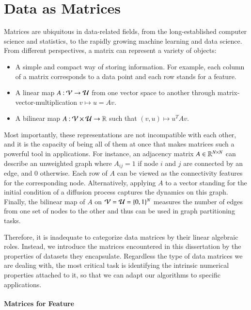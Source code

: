 \section{Data as Matrices}\label{pre:dam}

Matrices are ubiquitous in data\hyp{}related fields, from the 
long\hyp{}established computer science and statistics, to the rapidly growing
machine learning and data science. From different perspectives, a matrix can
represent a variety of objects:
\begin{itemize}
	\item A simple and compact way of storing information. For example, each
	column of a matrix corresponds to a data point and each row stands for a
	feature.
	\item A linear map $A\mathbin{:}\mathcal{V}\to\mathcal{U}$ from one vector space to another
	through matrix\hyp{}vector\hyp{}multiplication $v\mapsto u = Av$. 
	\item A bilinear map $A\mathbin{:}\mathcal{V}\times\mathcal{U}\to \mathbb{R}$ such that $(v,
	u)\mapsto u^TAv$.
\end{itemize}
Most importantly, these representations are not incompatible with each other,
and it is the capacity of being all of them at once that makes matrices such
a powerful tool in applications. For instance, an adjacency matrix $A\in\mathbb{R}^
{N\mathbin{\times} N}$ can describe an unweighted graph where $A_{ij} = 1$ if node $i$
and $j$ are connected by an edge, and $0$ otherwise. Each row of $A$ can be
viewed as the connectivity features for the corresponding node. Alternatively,
applying $A$ to a vector standing for the initial condition of a diffusion
process captures the dynamics on this graph. Finally, the bilinear map of $A$ on
$\mathcal{V} = \mathcal{U} = \{0, 1\}^N$ measures the number of edges from one set of nodes
to the other and thus can be used in graph partitioning tasks.

Therefore, it is inadequate to categorize data matrices by their linear
algebraic roles. Instead, we introduce the matrices encountered in this
dissertation by the properties of datasets they encapsulate. Regardless the type
of data matrices we are dealing with, the most critical task is identifying the
intrinsic numerical properties attached to it, so that we can adapt our
algorithms to specific applications.

\paragraph{Matrices for Feature}

